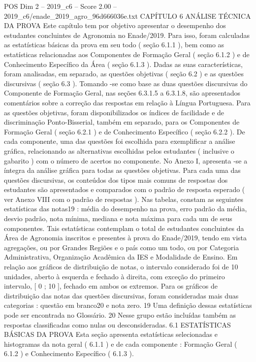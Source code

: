 \begin{textsample}{POS Dim 2 – 2019\_c6 – Score 2.00 – 2019\_c6/enade\_2019\_agro\_96d666036e.txt}  \label{ex:f2_pos_160}
CAPÍTULO 6 ANÁLISE TÉCNICA DA PROVA Este capítulo tem por objetivo apresentar o desempenho dos estudantes concluintes de Agronomia no Enade/2019.
Para isso, foram calculadas as estatísticas básicas da prova em seu todo ( seção 6.1.1 ), bem como as estatísticas relacionadas aos Componentes de Formação Geral ( seção 6.1.2 ) e de Conhecimento Específico da Área ( seção 6.1.3 ).
Dadas as suas características, foram analisadas, em separado, as questões objetivas ( seção 6.2 ) e as questões discursivas ( seção 6.3 ).
Tomando -se como base as duas questões discursivas do Componente de Formação Geral, nas seções 6.3.1.5 a 6.3.1.8, são apresentados comentários sobre a correção das respostas em relação à Língua Portuguesa.
Para as questões objetivas, foram disponibilizados os índices de facilidade e de discriminação Ponto-Bisserial, também em separado, para os Componentes de Formação Geral ( seção 6.2.1 ) e de Conhecimento Específico ( seção 6.2.2 ).
De cada componente, uma das questões foi escolhida para exemplificar a análise gráfica, relacionando as alternativas escolhidas pelos estudantes ( inclusive o gabarito ) com o número de acertos no componente.
No Anexo I, apresenta -se a íntegra da análise gráfica para todas as questões objetivas.
Para cada uma das questões discursivas, os conteúdos dos tipos mais comuns de respostas dos estudantes são apresentados e comparados com o padrão de resposta esperado ( ver Anexo VIII com o padrão de respostas ).
Nas tabelas, constam as seguintes estatísticas das notas19 : média do desempenho na prova, erro padrão da média, desvio padrão, nota mínima, mediana e nota máxima para cada um de seus componentes.
Tais estatísticas contemplam o total de estudantes concluintes da Área de Agronomia inscritos e presentes à prova do Enade/2019, tendo em vista agregações, ou por Grandes Regiões e o país como um todo, ou por Categoria Administrativa, Organização Acadêmica da IES e Modalidade de Ensino.
Em relação aos gráficos de distribuição de notas, o intervalo considerado foi de 10 unidades, aberto à esquerda e fechado à direita, com exceção do primeiro intervalo, [ 0 ; 10 ], fechado em ambos os extremos.
Para os gráficos de distribuição das notas das questões discursivas, foram consideradas mais duas categorias : questão em branco20 e nota zero. 19 Uma definição dessas estatísticas pode ser encontrada no Glossário. 20 Nesse grupo estão incluídas também as respostas classificadas como nulas ou desconsideradas. 6.1 ESTATÍSTICAS BÁSICAS DA PROVA Esta seção apresenta estatísticas selecionadas e histogramas da nota geral ( 6.1.1 ) e de cada componente : Formação Geral ( 6.1.2 ) e Conhecimento Específico ( 6.1.3 ).

\end{textsample}
